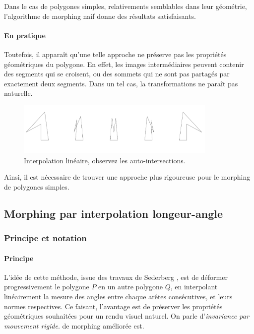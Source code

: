 \begin{codeb}
    Dans le cas de polygones simples, relativements semblables dans leur géométrie, 
    l'algorithme de morphing naif donne des résultats satisfaisants.
\end{codeb}

\paragraph{En pratique} Toutefois, il apparaît qu'une telle approche ne préserve pas les propriétés géométriques
du polygone. En effet, les images intermédiaires peuvent contenir des segments qui se croisent, 
ou des sommets qui ne sont pas partagés par exactement deux segments. Dans un tel cas, la transformations
ne paraît pas naturelle.
\begin{figure}[h!]
    \centering
    \includegraphics{img/p1/naif.png}
    \caption{Interpolation linéaire, observez les auto-intersections. \cite{cornillac2010morphing}}
\end{figure}
\newline
Ainsi, il est nécessaire de trouver une approche plus rigoureuse pour le morphing de polygones simples.

\subsection[Méthode L-A]{Morphing par interpolation longeur-angle}

\subsubsection{Principe et notation}
\paragraph{Principe} L'idée de cette méthode, issue des travaux de Sederberg \cite{sederberg1993}, est de déformer progressivement le polygone $P$ en un autre polygone $Q$, en interpolant
linéairement la mesure des angles entre chaque arêtes consécutives, et leurs normes respectives. Ce faisant, l'avantage est de préserver les propriétés géométriques
 souhaitées pour un rendu visuel naturel. On parle d'\emph{invariance par mouvement rigide}.
 de morphing améliorée est.

